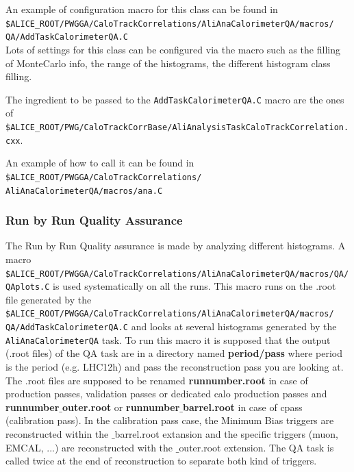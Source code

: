 An example of configuration macro for this class can be found in \\
\texttt{\$ALICE\_ROOT/PWGGA/CaloTrackCorrelations/AliAnaCalorimeterQA/macros/\\QA/AddTaskCalorimeterQA.C}\\ 

Lots of settings for this class can be configured via the macro
such as the filling of MonteCarlo info, the range of the histograms, the different histogram class filling.

The ingredient to be passed to the \texttt{AddTaskCalorimeterQA.C} macro are the ones of\\
\texttt{\$ALICE\_ROOT/PWG/CaloTrackCorrBase/AliAnalysisTaskCaloTrackCorrelation.cxx}.
 
An example of how to call it can be found in 
\texttt{\$ALICE\_ROOT/PWGGA/CaloTrackCorrelations/\\AliAnaCalorimeterQA/macros/ana.C}\\

\subsubsection{Run by Run Quality Assurance}

 The Run by Run Quality assurance is made by analyzing different histograms.
A macro \\ \texttt{\$ALICE\_ROOT/PWGGA/CaloTrackCorrelations/AliAnaCalorimeterQA/macros/QA/QAplots.C} is used systematically on all the runs.
This macro runs on the .root file generated by the\\ \texttt{\$ALICE\_ROOT/PWGGA/CaloTrackCorrelations/AliAnaCalorimeterQA/macros/ \\ QA/AddTaskCalorimeterQA.C} and looks at several histograms generated by the \texttt{AliAnaCalorimeterQA} task.
To run this macro it is supposed that the output (.root files) of the QA task are in a directory named {\bf period/pass} where period is the period (e.g. LHC12h) and pass the reconstruction pass you are looking at. The .root files are supposed to be renamed {\bf runnumber.root} in case of production passes, validation passes or dedicated calo production passes and {\bf runnumber$\_$outer.root} or {\bf runnumber$\_$barrel.root} in case of cpass (calibration pass). In the calibration pass case, the Minimum Bias triggers are reconstructed within the $\_$barrel.root extansion and the specific triggers (muon, EMCAL, ...) are reconstructed with the $\_$outer.root extension. The QA task is called twice at the end of reconstruction to separate both kind of triggers.

